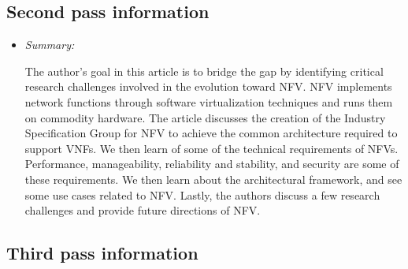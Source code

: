 \documentclass[letterpaper,twocolumn,10pt]{article}
\begin{document}
\subsection{Second pass information}
\label{sec:second}

\begin{itemize}

\item {\it Summary:} 

The author's goal in this article is to bridge the gap by identifying critical research challenges involved in the
evolution toward NFV. NFV implements network functions through software virtualization techniques and runs
them on commodity hardware. The article discusses the creation of the Industry Specification Group for NFV
to achieve the common architecture required to support VNFs. We then learn of some of the technical requirements
of NFVs. Performance, manageability, reliability and stability, and security are some of these requirements. We then
learn about the architectural framework, and see some use cases related to NFV. Lastly, the authors discuss a few
research challenges and provide future directions of NFV.

\end{itemize}

\subsection{Third pass information}
\label{sec:third}
\end{document}
